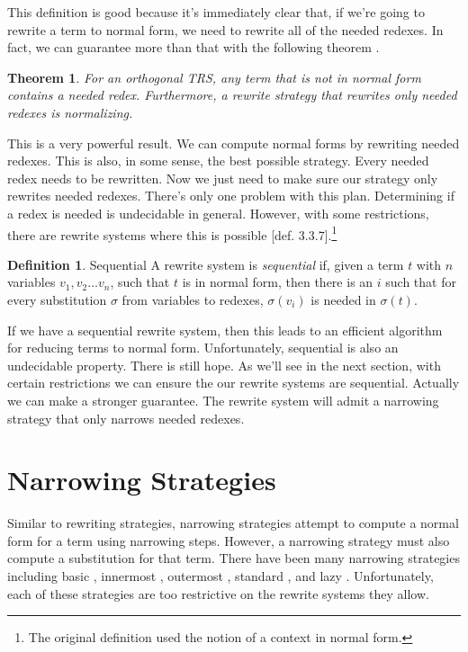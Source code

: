 \documentclass{book}
\newtheorem{theorem}{Theorem}
\theoremstyle{definition}
\newtheorem{definition}{Definition}[section]
\begin{document}
This definition is good because it's immediately clear that, if we're going
to rewrite a term to normal form, we need to rewrite all of the needed redexes.
In fact, we can guarantee more than that with the following theorem \cite{condKaplan}.

\begin{theorem}
    For an orthogonal TRS, any term that is not in normal form contains a needed redex.
    Furthermore, a rewrite strategy that rewrites only needed redexes is normalizing.
\end{theorem}

This is a very powerful result.
We can compute normal forms by rewriting needed redexes.
This is also, in some sense, the best possible strategy.
Every needed redex needs to be rewritten.
Now we just need to make sure our strategy only rewrites needed redexes.
There's only one problem with this plan.
Determining if a redex is needed is undecidable in general.
However, with some restrictions, there are rewrite systems where this is possible
\cite{termRewriting}[def. 3.3.7].\footnote{The original definition used the notion of a
                                           context in normal form.}

\theoremstyle{definition}
\begin{definition}{Sequential}
    A rewrite system is \emph{sequential} if, given a term $t$ with $n$ variables $v_1,v_2\ldots v_n$,
    such that $t$ is in normal form,
    then there is an $i$ such that for every substitution $\sigma$ from variables to redexes,
    $\sigma(v_i)$ is needed in $\sigma(t)$.
\end{definition}

If we have a sequential rewrite system,
then this leads to an efficient algorithm for reducing terms to normal form.
Unfortunately, sequential is also an undecidable property.
There is still hope.
As we'll see in the next section,
with certain restrictions we can ensure the our rewrite systems are sequential.
Actually we can make a stronger guarantee.
The rewrite system will admit a narrowing strategy that only narrows needed redexes.

\section{Narrowing Strategies}

Similar to rewriting strategies, narrowing strategies attempt to compute a normal form
for a term using narrowing steps.
However, a narrowing strategy must also compute a substitution for that term.
There have been many narrowing strategies including basic \cite{basicNarrowing},
innermost \cite{slog}, outermost \cite{outerNarrowing},
standard \cite{standardNarrowing}, and lazy \cite{lazyNarrowing}.
Unfortunately, each of these strategies are too restrictive on the rewrite systems they allow.
\end{document}
